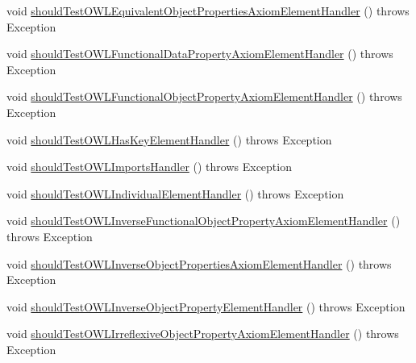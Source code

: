 \begin{DoxyCompactItemize}
void \hyperlink{classorg_1_1semanticweb_1_1owlapi_1_1contract_1_1_contract_owlxmlparser_test_ad4b1ed2cad34e1cc5295a1d898397b5e}{should\-Test\-O\-W\-L\-Equivalent\-Object\-Properties\-Axiom\-Element\-Handler} ()  throws Exception 
\item 
void \hyperlink{classorg_1_1semanticweb_1_1owlapi_1_1contract_1_1_contract_owlxmlparser_test_aa253a2eaaec5f552553d0ba7ad49d3f7}{should\-Test\-O\-W\-L\-Functional\-Data\-Property\-Axiom\-Element\-Handler} ()  throws Exception 
\item 
void \hyperlink{classorg_1_1semanticweb_1_1owlapi_1_1contract_1_1_contract_owlxmlparser_test_ab1f4f1a9eb2c301b07473ef46f7c5872}{should\-Test\-O\-W\-L\-Functional\-Object\-Property\-Axiom\-Element\-Handler} ()  throws Exception 
\item 
void \hyperlink{classorg_1_1semanticweb_1_1owlapi_1_1contract_1_1_contract_owlxmlparser_test_a50e507e6e80a720c0480302d2e0343c3}{should\-Test\-O\-W\-L\-Has\-Key\-Element\-Handler} ()  throws Exception 
\item 
void \hyperlink{classorg_1_1semanticweb_1_1owlapi_1_1contract_1_1_contract_owlxmlparser_test_af124feae08e7bc52b643bbb8ffb57176}{should\-Test\-O\-W\-L\-Imports\-Handler} ()  throws Exception 
\item 
void \hyperlink{classorg_1_1semanticweb_1_1owlapi_1_1contract_1_1_contract_owlxmlparser_test_a5ddd0679074b17c0e8a714110c0fbd84}{should\-Test\-O\-W\-L\-Individual\-Element\-Handler} ()  throws Exception 
\item 
void \hyperlink{classorg_1_1semanticweb_1_1owlapi_1_1contract_1_1_contract_owlxmlparser_test_a3429e8c55277e60239d67422a093ce40}{should\-Test\-O\-W\-L\-Inverse\-Functional\-Object\-Property\-Axiom\-Element\-Handler} ()  throws Exception 
\item 
void \hyperlink{classorg_1_1semanticweb_1_1owlapi_1_1contract_1_1_contract_owlxmlparser_test_ada9e3a8b1a3d83a4c6e2e19ad68e14e3}{should\-Test\-O\-W\-L\-Inverse\-Object\-Properties\-Axiom\-Element\-Handler} ()  throws Exception 
\item 
void \hyperlink{classorg_1_1semanticweb_1_1owlapi_1_1contract_1_1_contract_owlxmlparser_test_acfb4acb0767d87603320d0a9700b70dc}{should\-Test\-O\-W\-L\-Inverse\-Object\-Property\-Element\-Handler} ()  throws Exception 
\item 
void \hyperlink{classorg_1_1semanticweb_1_1owlapi_1_1contract_1_1_contract_owlxmlparser_test_a3bafe58a731c9da7c6ca891292651e7e}{should\-Test\-O\-W\-L\-Irreflexive\-Object\-Property\-Axiom\-Element\-Handler} ()  throws Exception 

\end{DoxyCompactItemize}

